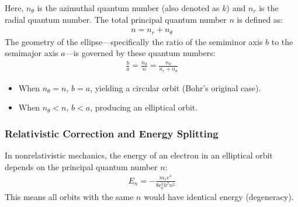 \documentclass[letterpaper,10pt,english]{jupyterBook}
\begin{document}
\sphinxAtStartPar
Here, \(n_\theta\) is the azimuthal quantum number (also denoted as \(k\)) and \(n_r\) is the radial quantum number. The total principal quantum number \(n\) is defined as:
\begin{equation*}
\begin{split}n = n_r + n_\theta\end{split}
\end{equation*}
\sphinxAtStartPar
The geometry of the ellipse—specifically the ratio of the semi\sphinxhyphen{}minor axis \(b\) to the semi\sphinxhyphen{}major axis \(a\)—is governed by these quantum numbers:
\begin{equation*}
\begin{split}\frac{b}{a} = \frac{n_\theta}{n} = \frac{n_\theta}{n_r + n_\theta}\end{split}
\end{equation*}\begin{itemize}
\item {} 
\sphinxAtStartPar
When \(n_\theta = n\), \(b = a\), yielding a circular orbit (Bohr’s original case).

\item {} 
\sphinxAtStartPar
When \(n_\theta < n\), \(b < a\), producing an elliptical orbit.

\end{itemize}


\subsubsection{Relativistic Correction and Energy Splitting}
\label{\detokenize{ch/quantum-mechanics/atom-models/sommerfeld:relativistic-correction-and-energy-splitting}}
\sphinxAtStartPar
In non\sphinxhyphen{}relativistic mechanics, the energy of an electron in an elliptical orbit depends  on the principal quantum number \(n\):
\begin{equation*}
\begin{split}E_n = -\frac{m_e e^4}{8 \epsilon_0^2 h^2 n^2}\end{split}
\end{equation*}
\sphinxAtStartPar
This means all orbits with the same \(n\) would have identical energy (degeneracy).
\end{document}
